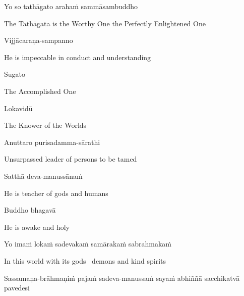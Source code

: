 Yo so tathāgato arahaṁ sammāsambuddho

\begin{english}
  The Tathāgata is the Worthy One the Perfectly Enlightened One
\end{english}

Vijjācaraṇa-sampanno

\begin{english}
  He is impeccable in conduct and understanding
\end{english}

Sugato

\begin{english}
  The Accomplished One
\end{english}

Lokavidū

\begin{english}
  The Knower of the Worlds
\end{english}

Anuttaro purisadamma-sārathi

\begin{english}
  Unsurpassed leader of persons to be tamed\ifdigitalversion\makeatletter\hyperlink{endnote3-appendix}\makeatother\fi
\end{english}

Satthā deva-manussānaṁ

\begin{english}
  He is teacher of gods and humans
\end{english}

Buddho bhagavā

\begin{english}
  He is awake and holy
\end{english}

Yo imaṁ lokaṁ sadevakaṁ samārakaṁ sabrahmakaṁ

\begin{english}
  In this world with its gods \breathmark\ demons and kind spirits
\end{english}

\begin{pali-hang}
  Sassamaṇa-brāhmaṇiṁ pajaṁ sadeva-manussaṁ sayaṁ abhiññā sacchikatvā pavedesi
\end{pali-hang}

